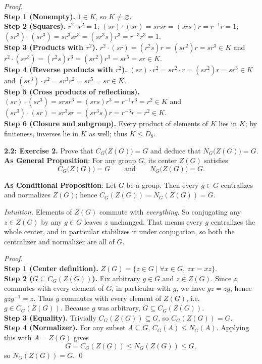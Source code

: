 \documentclass[12pt]{article}
\theoremstyle{definition}
\begin{document}
\emph{Proof.}\\
\textbf{Step 1 (Nonempty).} $1\in K$, so $K\neq\varnothing$.\\
\textbf{Step 2 (Squares).} $r^2\cdot r^2=1$; $(sr)\cdot(sr)=s r s r=(s r s) r=r^{-1} r=1$; $(sr^3)\cdot(sr^3)=s r^3 s r^3=(s r^3 s) r^3=r^{-3} r^3=1$.\\
\textbf{Step 3 (Products with $r^2$).} $r^2\cdot(sr)= (r^2 s) r=(s r^2) r=s r^3\in K$ and $r^2\cdot(sr^3)=(r^2 s) r^3=(s r^2) r^3=s r^5=s r\in K$.\\
\textbf{Step 4 (Reverse products with $r^2$).} $(sr)\cdot r^2=s r^2\cdot r=(s r^2) r=s r^3\in K$ and $(sr^3)\cdot r^2=s r^3 r^2=s r^5=s r\in K$.\\
\textbf{Step 5 (Cross products of reflections).} $(sr)\cdot(sr^3)=s r s r^3=(s r s) r^3=r^{-1} r^3=r^2\in K$ and $(sr^3)\cdot(sr)=s r^3 s r=(s r^3 s) r=r^{-3} r=r^2\in K$.\\
\textbf{Step 6 (Closure and subgroup).} Every product of elements of $K$ lies in $K$; by finiteness, inverses lie in $K$ as well; thus $K\le D_8$.\\

\newpage

\newpage

\noindent \textbf{2.2: Exercise 2.} Prove that $C_G\!\big(Z(G)\big)=G$ and deduce that $N_G\!\big(Z(G)\big)=G$.\\ %

\noindent\textbf{As General Proposition}: For any group $G$, its center $Z(G)$ satisfies
\[
C_G\!\big(Z(G)\big)=G \qquad\text{and}\qquad N_G\!\big(Z(G)\big)=G .
\]

\noindent \textbf{As Conditional Proposition}: Let $G$ be a group. Then every $g\in G$ centralizes and normalizes $Z(G)$; hence $C_G(Z(G))=N_G(Z(G))=G$.

\newpage

\dotfill

\emph{Intuition.} Elements of $Z(G)$ commute with \emph{everything}. So conjugating any $z\in Z(G)$ by any $g\in G$ leaves $z$ unchanged. That means every $g$ centralizes the whole center, and in particular stabilizes it under conjugation, so both the centralizer and normalizer are all of $G$.\\

\dotfill

\emph{Proof.}\\
\textbf{Step 1 (Center definition).} $Z(G)=\{z\in G\mid \forall x\in G,\ zx=xz\}$.\\
\textbf{Step 2 ($G\subseteq C_G(Z(G))$).} Fix arbitrary $g\in G$ and $z\in Z(G)$. Since $z$ commutes with every element of $G$, in particular with $g$, we have $gz=zg$, hence $gzg^{-1}=z$. Thus $g$ commutes with every element of $Z(G)$, i.e.\ $g\in C_G(Z(G))$. Because $g$ was arbitrary, $G\subseteq C_G(Z(G))$.\\
\textbf{Step 3 (Equality).} Trivially $C_G(Z(G))\subseteq G$, so $C_G(Z(G))=G$.\\
\textbf{Step 4 (Normalizer).} For any subset $A\subseteq G$, $C_G(A)\le N_G(A)$. Applying this with $A=Z(G)$ gives
\[
G=C_G(Z(G))\le N_G(Z(G))\le G,
\]
so $N_G(Z(G))=G$. \qed
\end{document}
